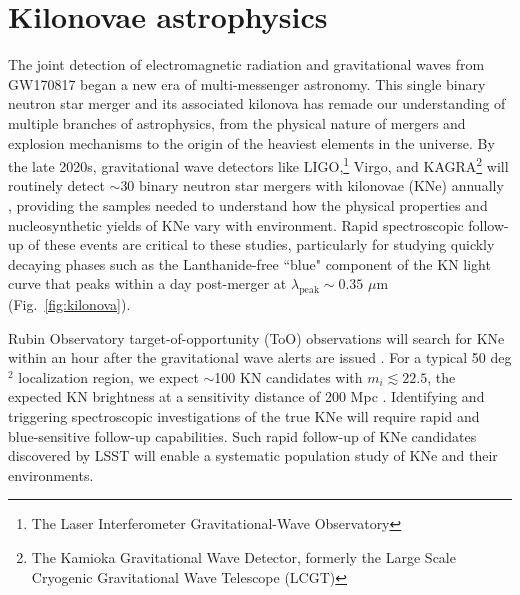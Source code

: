 \documentclass[11pt,a4paper,twoside,onecolumn,openany,final,oldfontcommands]{memoir}
\begin{document}



\section{Kilonovae astrophysics}

The joint detection of electromagnetic radiation and gravitational waves from GW170817 began a new era of multi-messenger astronomy.  This single binary neutron star merger and its associated kilonova has remade our understanding of multiple branches of astrophysics, from the physical nature of mergers and explosion mechanisms to the origin of the heaviest elements in the universe.  By the late 2020s, gravitational wave detectors like LIGO,\footnote{The Laser Interferometer Gravitational-Wave Observatory} Virgo, and KAGRA\footnote{The Kamioka Gravitational Wave Detector, formerly the Large Scale Cryogenic Gravitational Wave Telescope (LCGT)} will routinely detect $\sim$30 binary neutron star mergers with kilonovae (KNe) annually \citep{abbott2018prospects}, providing the samples needed to understand how the physical properties and nucleosynthetic yields of KNe vary with environment.  Rapid spectroscopic follow-up of these events are critical to these studies, particularly for studying quickly decaying phases such as the Lanthanide-free ``blue" component of the KN light curve that peaks within a day post-merger at $\lambda_\mathrm{peak}\sim0.35$ $\mu$m (Fig.~\ref{fig:kilonova}).

Rubin Observatory target-of-opportunity (ToO) observations will search for KNe within an hour after the gravitational wave alerts are issued \citep[assuming the strategy proposed by][]{margutti2018}. For a typical 50 deg$^2$ localization region, we expect $\sim$100 KN candidates with $m_i\lesssim22.5$, the expected KN brightness at a sensitivity distance of 200 Mpc \citep{cowperthwaite2017, goldstein2019}. Identifying and triggering spectroscopic investigations of the true KNe will require rapid and blue-sensitive follow-up capabilities. Such rapid follow-up of KNe candidates discovered by LSST will enable a systematic population study of KNe and their environments.
\end{document}
